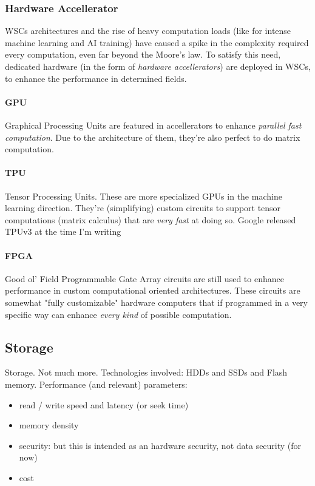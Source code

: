 \documentclass[10pt,a4paper]{article}
\begin{document}
				\subsubsection{Hardware Accellerator}
					WSCs architectures and the rise of heavy computation loads (like for intense machine learning and AI training) have caused a spike in the complexity required every computation, even far beyond the Moore's law. To satisfy this need, dedicated hardware (in the form of \emph{hardware accellerators}) are deployed in WSCs, to enhance the performance in determined fields.
					
					\paragraph{GPU}
						Graphical Processing Units are featured in accellerators to enhance \emph{parallel fast computation}. Due to the architecture of them, they're also perfect to do matrix computation. 
						
					\paragraph{TPU}
						Tensor Processing Units. These are more specialized GPUs in the machine learning direction. They're (simplifying) custom circuits to support tensor computations (matrix calculus) that are \emph{very fast} at doing so. Google released TPUv3 at the time I'm writing
						
					\paragraph{FPGA}
						Good ol' Field Programmable Gate Array circuits are still used to enhance performance in custom computational oriented architectures. These circuits are somewhat "fully customizable" hardware computers that if programmed in a very specific way can enhance \emph{every kind} of possible computation. 
			
			\subsection{Storage}
				Storage. Not much more. Technologies involved: HDDs and SSDs and Flash memory. Performance (and relevant) parameters:
				\begin{itemize}
					\item read / write speed and latency (or seek time)
					\item memory density
					\item security: but this is intended as an hardware security, not data security (for now)
					\item cost
				\end{itemize}
				
\end{document}
